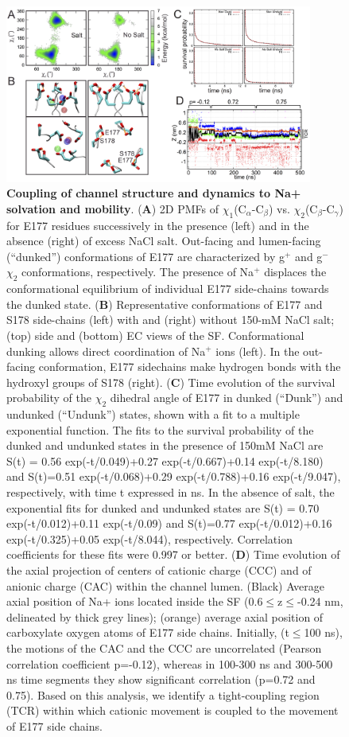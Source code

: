 \begin{refsection}
\begin{figure}[!htb]
\centering
\includegraphics[width=0.9\textwidth]{nav1/Nav1FigS8}
\caption[Coupling of channel structure and dynamics to Na+ solvation and mobility]{\textbf{Coupling of channel structure and dynamics to Na+ solvation and mobility}. (\textbf{A}) 2D PMFs of $\chi_{1}$(C$_{\alpha}$-C$_{\beta}$) vs. $\chi_{2}$(C$_{\beta}$-C$_{\gamma}$) for E177 residues successively in the presence (left) and in the absence (right) of excess NaCl salt.  Out-facing and lumen-facing (``dunked'') conformations of E177 are characterized by g$^{+}$ and g$^{-}$ $\chi_{2}$ conformations, respectively.  The presence of Na$^+$ displaces the conformational equilibrium of individual E177 side-chains towards the dunked state. (\textbf{B}) Representative conformations of E177 and S178 side-chains (left) with and (right) without 150-mM NaCl salt; (top) side and (bottom) EC views of the SF.  Conformational dunking allows direct coordination of Na$^+$ ions (left).  In the out-facing conformation, E177 sidechains make hydrogen bonds with the hydroxyl groups of S178 (right). (\textbf{C}) Time evolution of the survival probability of the $\chi_{2}$ dihedral angle of E177 in dunked (``Dunk'') and undunked (``Undunk'') states, shown with a fit to a multiple exponential function.  The fits to the survival probability of the dunked and undunked states in the presence of 150mM NaCl are S(t) = 0.56 exp(-t/0.049)+0.27 exp(-t/0.667)+0.14 exp(-t/8.180) and S(t)=0.51 exp(-t/0.068)+0.29 exp(-t/0.788)+0.16 exp(-t/9.047), respectively, with time t expressed in ns.  In the absence of salt, the exponential fits for dunked and undunked states are S(t) = 0.70 exp(-t/0.012)+0.11 exp(-t/0.09) and S(t)=0.77 exp(-t/0.012)+0.16 exp(-t/0.325)+0.05 exp(-t/8.044), respectively.  Correlation coefficients for these fits were 0.997 or better. (\textbf{D}) Time evolution of the axial projection of centers of cationic charge (CCC) and of anionic charge (CAC) within the channel lumen.  (Black) Average axial position of Na+ ions located inside the SF (0.6$\leq$z$\leq$-0.24 nm, delineated by thick grey lines); (orange) average axial position of carboxylate oxygen atoms of E177 side chains.  Initially, (t$\leq$100 ns), the motions of the CAC and the CCC are uncorrelated (Pearson correlation coefficient p=-0.12), whereas in 100-300 ns and 300-500 ns time segments they show significant correlation (p=0.72 and 0.75).  Based on this analysis, we identify a tight-coupling region (TCR) within which cationic movement is coupled to the movement of E177 side chains.}

\end{figure}
\end{refsection}
